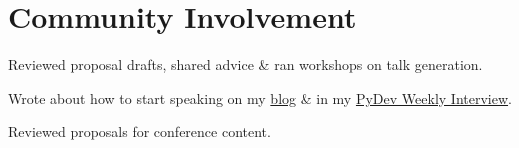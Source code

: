 \documentclass[letterpaper]{deedy-resume} %
\begin{document}
\begin{minipage}[t]{0.66\textwidth}
\sectionspace %
\vspace{-0.8\baselineskip}
%
%

\section{Community Involvement}

%
\begin{tightitemize}
\item Reviewed proposal drafts, shared advice \& ran workshops on talk generation.
\item Wrote about how to start speaking on my \href{}{blog} \& in my \href{}{PyDev Weekly Interview}.
\end{tightitemize}
%
\sectionspace %


% 
\begin{tightitemize}
\item Reviewed proposals for conference content.
\end{tightitemize}
%
\sectionspace %
\vspace{0.2\baselineskip}


\end{minipage}
\end{document}
